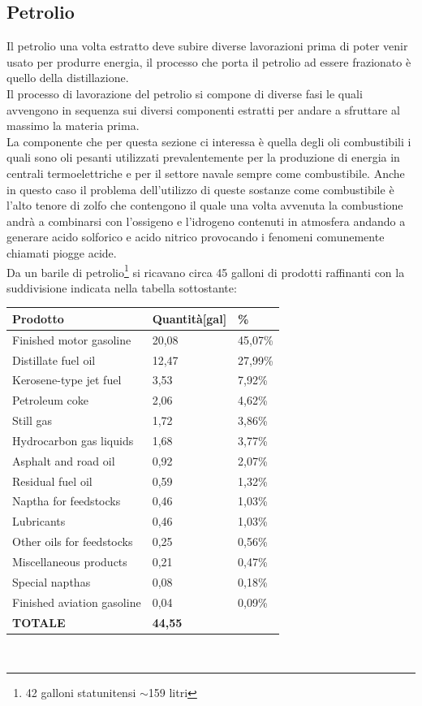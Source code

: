 \subsection{Petrolio}
Il petrolio una volta estratto deve subire diverse lavorazioni prima di poter venir usato per produrre energia, il processo che porta il petrolio ad essere frazionato è quello della distillazione.\\
Il processo di lavorazione del petrolio si compone di diverse fasi le quali avvengono in sequenza sui diversi componenti estratti per andare a sfruttare al massimo la materia prima.\\
La componente che per questa sezione ci interessa è quella degli oli combustibili i quali sono oli pesanti utilizzati prevalentemente per la produzione di energia in centrali termoelettriche e per il settore navale sempre come combustibile.
Anche in questo caso il problema dell'utilizzo di queste sostanze come combustibile è l'alto tenore di zolfo che contengono il quale una volta avvenuta la combustione andrà a combinarsi con l'ossigeno e l'idrogeno contenuti in atmosfera andando a generare acido solforico e acido nitrico provocando i fenomeni comunemente chiamati piogge acide.\\
Da un barile di petrolio\footnote{42 galloni statunitensi $\sim$159 litri} si ricavano circa 45 galloni di prodotti raffinanti con la suddivisione indicata nella tabella sottostante\cite{composizione-petrolio}:\\
\begin{table}[!ht]
    \centering
    \begin{tabular}{|l|l|l|}
    \hline
        \textbf{Prodotto} & \textbf{Quantità[gal]} & \textbf{\%} \\ \hline
        Finished motor gasoline & 20,08 & 45,07\% \\ \hline
        Distillate fuel oil & 12,47 & 27,99\% \\ \hline
        Kerosene-type jet fuel & 3,53 & 7,92\% \\ \hline
        Petroleum coke & 2,06 & 4,62\% \\ \hline
        Still gas & 1,72 & 3,86\% \\ \hline
        Hydrocarbon gas liquids & 1,68 & 3,77\% \\ \hline
        Asphalt and road oil & 0,92 & 2,07\% \\ \hline
        Residual fuel oil & 0,59 & 1,32\% \\ \hline
        Naptha for feedstocks & 0,46 & 1,03\% \\ \hline
        Lubricants & 0,46 & 1,03\% \\ \hline
        Other oils for feedstocks & 0,25 & 0,56\% \\ \hline
        Miscellaneous products & 0,21 & 0,47\% \\ \hline
        Special napthas & 0,08 & 0,18\% \\ \hline
        Finished aviation gasoline & 0,04 & 0,09\% \\ \hline
        \textbf{TOTALE} & \textbf{44,55} & \\ \hline
    \end{tabular}
\end{table}\\

